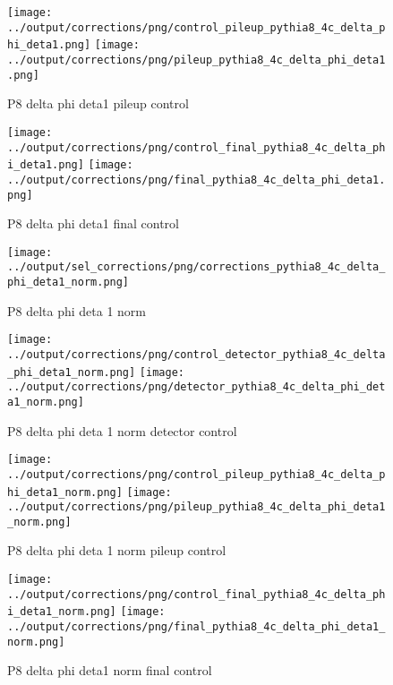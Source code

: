 \documentclass[11pt]{book}
\begin{document}
\begin{figure}[ht]
\centering
\texttt{[image: ../output/corrections/png/control\_pileup\_pythia8\_4c\_delta\_phi\_deta1.png]}
\texttt{[image: ../output/corrections/png/pileup\_pythia8\_4c\_delta\_phi\_deta1.png]}
\caption{P8 delta phi deta1 pileup control}
\label{fig:p8_delta_phi_deta1_pileup_control}
\end{figure}


\begin{figure}[ht]
\centering
\texttt{[image: ../output/corrections/png/control\_final\_pythia8\_4c\_delta\_phi\_deta1.png]}
\texttt{[image: ../output/corrections/png/final\_pythia8\_4c\_delta\_phi\_deta1.png]}
\caption{P8 delta phi deta1 final control}
\label{fig:p8_delta_phi_deta1_final_control}
\end{figure}

\begin{figure}[ht]
\centering
\texttt{[image: ../output/sel\_corrections/png/corrections\_pythia8\_4c\_delta\_phi\_deta1\_norm.png]}
\caption{P8 delta phi deta 1 norm}
\label{fig:p8_delta_phi_deta1_norm}
\end{figure}

\begin{figure}[ht]
\centering
\texttt{[image: ../output/corrections/png/control\_detector\_pythia8\_4c\_delta\_phi\_deta1\_norm.png]}
\texttt{[image: ../output/corrections/png/detector\_pythia8\_4c\_delta\_phi\_deta1\_norm.png]}
\caption{P8 delta phi deta 1 norm detector control}
\label{fig:p8_delta_phi_deta1_norm_detector_control}
\end{figure}

\begin{figure}[ht]
\centering
\texttt{[image: ../output/corrections/png/control\_pileup\_pythia8\_4c\_delta\_phi\_deta1\_norm.png]}
\texttt{[image: ../output/corrections/png/pileup\_pythia8\_4c\_delta\_phi\_deta1\_norm.png]}
\caption{P8 delta phi deta 1 norm pileup control}
\label{fig:p8_delta_phi_deta1_norm_pileup_control}
\end{figure}

\begin{figure}[ht]
\centering
\texttt{[image: ../output/corrections/png/control\_final\_pythia8\_4c\_delta\_phi\_deta1\_norm.png]}
\texttt{[image: ../output/corrections/png/final\_pythia8\_4c\_delta\_phi\_deta1\_norm.png]}
\caption{P8 delta phi deta1 norm final control}
\label{fig:p8_delta_phi_deta1_norm_final_control}
\end{figure}
\end{document}
